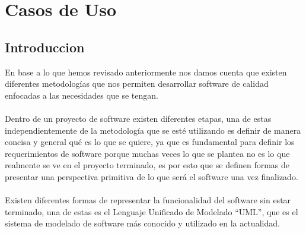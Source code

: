 \chapter{Casos de Uso}
\section{Introduccion}
En base a lo que hemos revisado anteriormente nos damos cuenta que existen diferentes metodologías que nos permiten desarrollar software de calidad enfocadas a las necesidades que se tengan.
\\
\\
Dentro de un proyecto de software existen diferentes etapas, una de estas independientemente de la metodología que se esté utilizando es definir de manera concisa y general qué es lo que se quiere, ya que es fundamental para definir los requerimientos de software porque muchas veces lo que se plantea no es lo que realmente se ve en el proyecto terminado, es por esto que se definen formas de presentar una perspectiva primitiva de lo que será el software una vez finalizado.
\\
\\
Existen diferentes formas de representar la funcionalidad del software sin estar terminado,  una de estas es el Lenguaje Unificado de Modelado  “UML”, que  es el sistema de modelado de software más conocido y utilizado en la actualidad.



